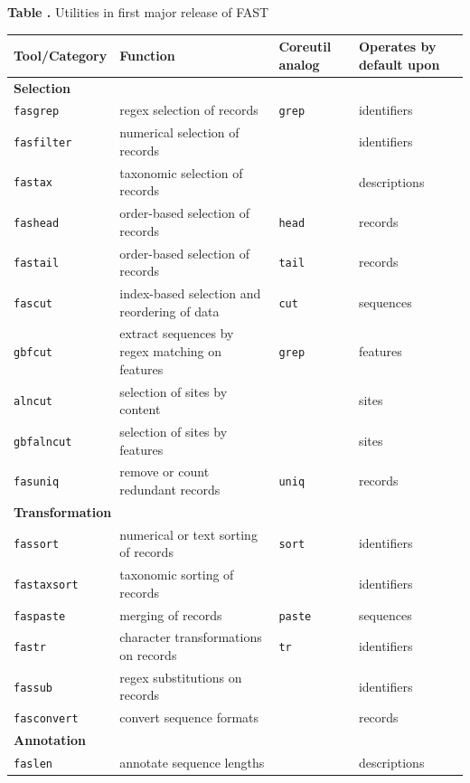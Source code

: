 \documentclass{frontiersSCNS} %
\begin{document}
\begin{table}[!t]
\textbf{\label{tab:01} Table .}{
  Utilities in first major release of FAST}

\processtable{ }
{\begin{tabular}{llll}\toprule
    Tool/Category  & Function  & Coreutil analog & Operates by default
    upon \\
 \hline
  \multicolumn{4}{l}{{\bf Selection}} \\
  \hline
    {\tt fasgrep} & regex selection of records & {\tt grep} & identifiers\\
    {\tt fasfilter} & numerical selection of records &  & identifiers \\
    {\tt fastax} & taxonomic selection of records &  & descriptions \\
    {\tt fashead} & order-based selection of records & {\tt head} & records \\
    {\tt fastail} & order-based selection of records &  {\tt tail}  & records \\
    {\tt fascut} & index-based selection and reordering of data  &    {\tt cut}  & sequences \\
    {\tt gbfcut} & extract sequences by regex matching on features  & {\tt grep}  & features\\
    {\tt alncut} & selection of sites by content &  & sites \\
    {\tt gbfalncut} & selection of sites by features &  & sites \\
    {\tt fasuniq} & remove or count redundant records & {\tt uniq} & records \\
 \hline
  \multicolumn{4}{l}{{\bf Transformation}} \\
  \hline    
   {\tt fassort} & numerical or text sorting of records  & {\tt sort} & identifiers\\
    {\tt fastaxsort} & taxonomic sorting of records &  & identifiers \\
    {\tt faspaste} & merging of records &  {\tt paste} & sequences \\
    {\tt fastr} & character transformations on records & {\tt tr} & identifiers\\
    {\tt fassub} & regex substitutions on records &  & identifiers \\
    {\tt fasconvert} & convert sequence formats &  &  records \\
\hline
  \multicolumn{4}{l}{{\bf Annotation}} \\
  \hline    
    {\tt faslen} & annotate sequence lengths &  & descriptions \\

\end{tabular}}
\end{table}
\end{document}

